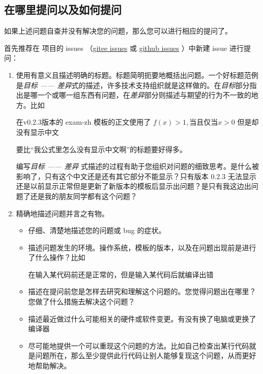 \subsection{在哪里提问以及如何提问}

如果上述问题自查并没有解决您的问题，那么您可以进行相应的提问了。

首先推荐在  项目的 issues （\href{https://gitee.com/xkwxdyy/exam-zh/issues}{gitee issues} 或 \href{https://github.com/xkwxdyy/exam-zh/issues}{github issues} ）中新建 issue 进行提问：
  \begin{enumerate}
    \item 使用有意义且描述明确的标题。标题简明扼要地概括出问题。一个好标题范例是\emph{目标 —— 差异}式的描述，许多技术支持组织就是这样做的。在\emph{目标}部分指出是哪一个或哪一组东西有问题，在\emph{差异}部分则描述与期望的行为不一致的地方。比如
      \begin{latexcode}[gobble = 8]
        在v0.2.3版本的 exam-zh 模板的正文使用了 $f(x) > 1, 当且仅当 x > 0$ 但是却没有显示中文
      \end{latexcode}
    要比“我公式里怎么没有显示中文啊”的标题要好得多。
    
    编写\emph{目标 —— 差异} 式描述的过程有助于您组织对问题的细致思考。是什么被影响了，只有这个中文还是还有其它部分不能显示？只有版本 0.2.3 无法显示还是以前显示正常但是更新了新版本的模板后显示出问题？是只有我这边出问题了还是我的朋友同学都有这个问题？
    \item 精确地描述问题并言之有物。
      \begin{itemize}
        \item 仔细、清楚地描述您的问题或 bug 的症状。
        \item 描述问题发生的环境。操作系统，模板的版本，以及在问题出现前是进行了什么操作？比如
          \begin{latexcode}[gobble = 12]
            在输入某代码前还是正常的，但是输入某代码后就编译出错
          \end{latexcode}
        \item 描述在提问前您是怎样去研究和理解这个问题的。您觉得问题出在哪里？您做了什么措施去解决这个问题？
        \item 描述最近做过什么可能相关的硬件或软件变更。有没有换了电脑或更换了编译器
        \item 尽可能地提供一个可以重现这个问题的方法。比如自己检查出某行代码就是问题所在，那么至少提供此行代码让别人能够复现这个问题，从而更好地帮助解决。
      \end{itemize}
  \end{enumerate}

